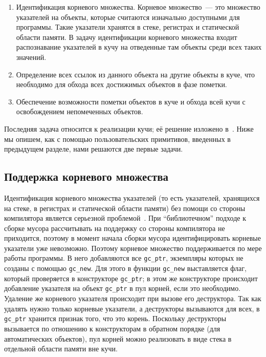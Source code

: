 \begin{enumerate}
\item Идентификация корневого множества. Корневое множество~--- это множество указателей на
объекты, которые считаются изначально доступными для программы. Такие указатели хранятся в
стеке, регистрах и статической области памяти. В задачу идентификации корневого множества 
входит распознавание указателей в кучу на отведенные там объекты среди всех таких значений.

\item Определение всех ссылок из данного объекта на другие объекты в куче, что необходимо для
обхода всех достижимых объектов в фазе пометки.

\item Обеспечение возможности пометки объектов в куче и обхода всей кучи с освобождением 
непомеченных объектов.
\end{enumerate}

Последняя задача относится к реализации кучи; её решение изложено в~\cite{realisation}. Ниже 
мы опишем, как с помощью пользовательских примитивов, введенных в предыдущем разделе,
нами решаются две первые задачи.

\subsection{Поддержка корневого множества}

Идентификация корневого множества указателей (то есть указателей, хранящихся на стеке, в регистрах и статической
области памяти) без помощи со стороны компилятора является серьезной проблемой~\cite{roots}. При ``библиотечном''
подходе к сборке мусора рассчитывать на поддержку со стороны компилятора не приходится, поэтому в момент
начала сборки мусора идентифицировать корневые указатели уже невозможно. Поэтому корневое множество
поддерживается по мере работы программы. В него добавляются все \lstinline{gc_ptr}, экземпляры которых
не созданы с помощью \lstinline{gc_new}. Для этого в функции \lstinline{gc_new} выставляется флаг,
который проверяется в конструкторе \lstinline{gc_ptr}; в этом же конструкторе происходит добавление
указателя на объект \lstinline{gc_ptr} в пул корней, если это необходимо. Удаление же корневого
указателя происходит при вызове его деструктора. Так как удалять нужно только корневые указатели, а деструкторы
вызываются для всех, в \lstinline{gc_ptr} хранится признак того, что это корень. Поскольку деструкторы 
вызывается по отношению к конструкторам в обратном порядке (для автоматических объектов), пул корней можно 
реализовать в виде стека в отдельной области памяти вне кучи. 

